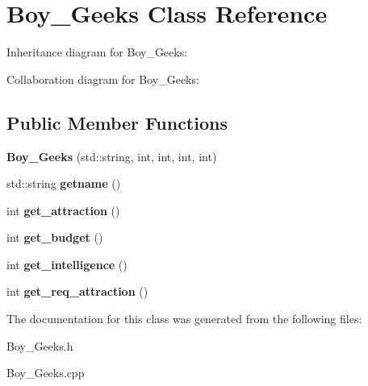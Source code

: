 \hypertarget{classBoy__Geeks}{}\section{Boy\+\_\+\+Geeks Class Reference}
\label{classBoy__Geeks}


Inheritance diagram for Boy\+\_\+\+Geeks\+:


Collaboration diagram for Boy\+\_\+\+Geeks\+:
\subsection*{Public Member Functions}
\begin{DoxyCompactItemize}
\item 
{\bfseries Boy\+\_\+\+Geeks} (std\+::string, int, int, int, int)\hypertarget{classBoy__Geeks_aed0fd9447e0153b557d824a34a1749b1}{}\label{classBoy__Geeks_aed0fd9447e0153b557d824a34a1749b1}

\item 
std\+::string {\bfseries getname} ()\hypertarget{classBoy__Geeks_a031f7b1edd9e8162bc3f9bff5bc91121}{}\label{classBoy__Geeks_a031f7b1edd9e8162bc3f9bff5bc91121}

\item 
int {\bfseries get\+\_\+attraction} ()\hypertarget{classBoy__Geeks_add7da15d5586160874a4aa1c76abb22c}{}\label{classBoy__Geeks_add7da15d5586160874a4aa1c76abb22c}

\item 
int {\bfseries get\+\_\+budget} ()\hypertarget{classBoy__Geeks_a11cbbd4acdf9123e6a9e3eca1d45ef1c}{}\label{classBoy__Geeks_a11cbbd4acdf9123e6a9e3eca1d45ef1c}

\item 
int {\bfseries get\+\_\+intelligence} ()\hypertarget{classBoy__Geeks_adff6ee57bf60d01798dc0e5db321d9b8}{}\label{classBoy__Geeks_adff6ee57bf60d01798dc0e5db321d9b8}

\item 
int {\bfseries get\+\_\+req\+\_\+attraction} ()\hypertarget{classBoy__Geeks_a2691d37a8da05ff549df133f79dad667}{}\label{classBoy__Geeks_a2691d37a8da05ff549df133f79dad667}

\end{DoxyCompactItemize}


The documentation for this class was generated from the following files\+:\begin{DoxyCompactItemize}
\item 
Boy\+\_\+\+Geeks.\+h\item 
Boy\+\_\+\+Geeks.\+cpp\end{DoxyCompactItemize}
